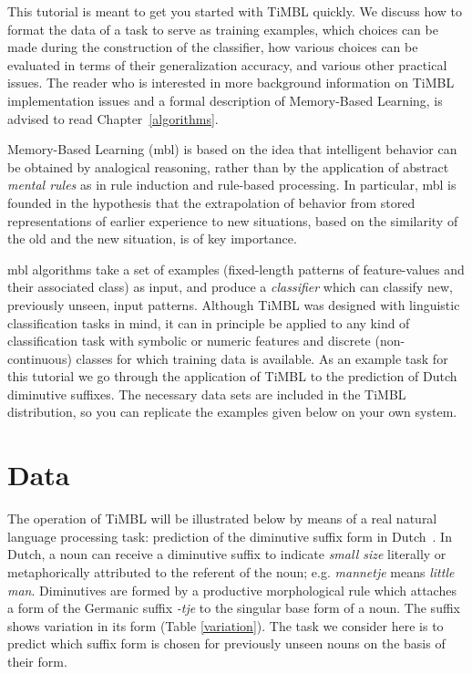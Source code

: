 \documentclass{report}
\begin{document}
This tutorial is meant to get you started with TiMBL quickly. We
discuss how to format the data of a task to serve as training
examples, which choices can be made during the construction of the
classifier, how various choices can be evaluated in terms of their
generalization accuracy, and various other practical issues. The
reader who is interested in more background information on TiMBL
implementation issues and a formal description of Memory-Based
Learning, is advised to read Chapter~\ref{algorithms}.

Memory-Based Learning ({\sc mbl}) is based on the idea that
intelligent behavior can be obtained by analogical reasoning, rather
than by the application of abstract {\em mental rules} as in rule
induction and rule-based processing. In particular, {\sc mbl} is
founded in the hypothesis that the extrapolation of behavior from
stored representations of earlier experience to new situations, based
on the similarity of the old and the new situation, is of key
importance.

{\sc mbl} algorithms take a set of examples (fixed-length patterns of
feature-values and their associated class) as input, and produce a
{\em classifier} which can classify new, previously unseen, input
patterns. Although TiMBL was designed with linguistic classification
tasks in mind, it can in principle be applied to any kind of
classification task with symbolic or numeric features and discrete
(non-continuous) classes for which training data is available. As an
example task for this tutorial we go through the application of TiMBL
to the prediction of Dutch diminutive suffixes. The necessary data
sets are included in the TiMBL distribution, so you can replicate the
examples given below on your own system.

\section{Data}

The operation of TiMBL will be illustrated below by means of a real
natural language processing task: prediction of the diminutive suffix
form in Dutch~\cite{Daelemans+97e}. In Dutch, a noun can receive a
diminutive suffix to indicate {\em small size} literally or
metaphorically attributed to the referent of the noun; e.g. {\em
mannetje} means {\em little man}. Diminutives are formed by a
productive morphological rule which attaches a form of the Germanic
suffix {\em -tje} to the singular base form of a noun. The suffix
shows variation in its form (Table \ref{variation}). The task we
consider here is to predict which suffix form is chosen for previously
unseen nouns on the basis of their form.
\end{document}
